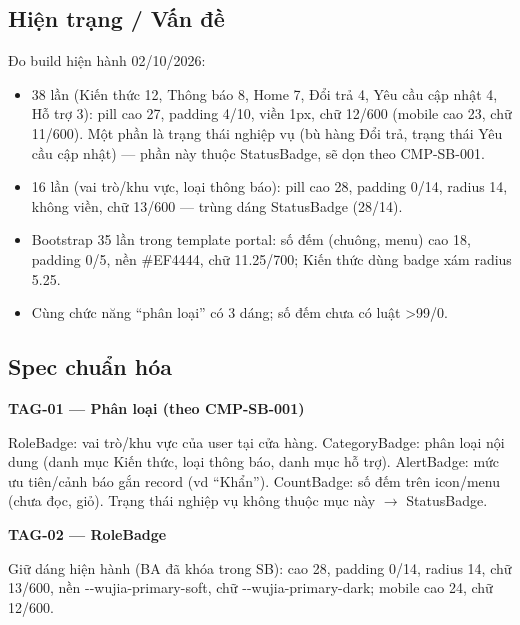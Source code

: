 \documentclass[11pt,a4paper]{report}
\begin{document}
\subsection*{Hiện trạng / Vấn đề}
Đo build hiện hành 02/\allowbreak{}10/\allowbreak{}2026:\par
\begin{itemize}
\item {} 38 lần (Kiến thức 12, Thông báo 8, Home 7, Đổi trả 4, Yêu cầu cập nhật 4, Hỗ trợ 3): pill cao 27, padding 4/\allowbreak{}10, viền 1px, chữ 12/\allowbreak{}600 (mobile cao 23, chữ 11/\allowbreak{}600). Một phần là trạng thái nghiệp vụ (bù hàng Đổi trả, trạng thái Yêu cầu cập nhật) — phần này thuộc StatusBadge, sẽ dọn theo CMP-SB-001.
\item {} 16 lần (vai trò/\allowbreak{}khu vực, loại thông báo): pill cao 28, padding 0/\allowbreak{}14, radius 14, không viền, chữ 13/\allowbreak{}600 — trùng dáng StatusBadge (28/\allowbreak{}14).
\item Bootstrap  35 lần trong template portal: số đếm (chuông, menu) cao 18, padding 0/\allowbreak{}5, nền \#EF4444, chữ 11.25/\allowbreak{}700; Kiến thức dùng badge xám radius 5.25.
\item Cùng chức năng “phân loại” có 3 dáng; số đếm chưa có luật \textgreater{}99/\allowbreak{}0.
\end{itemize}
\subsection*{Spec chuẩn hóa}
\par\smallskip\textbf{TAG-01 — Phân loại (theo CMP-SB-001)}\par
RoleBadge: vai trò/\allowbreak{}khu vực của user tại cửa hàng. CategoryBadge: phân loại nội dung (danh mục Kiến thức, loại thông báo, danh mục hỗ trợ). AlertBadge: mức ưu tiên/\allowbreak{}cảnh báo gắn record (vd “Khẩn”). CountBadge: số đếm trên icon/\allowbreak{}menu (chưa đọc, giỏ). Trạng thái nghiệp vụ không thuộc mục này \(\to\) StatusBadge.\par

\par\smallskip\textbf{TAG-02 — RoleBadge}\par
Giữ dáng  hiện hành (BA đã khóa trong SB): cao 28, padding 0/\allowbreak{}14, radius 14, chữ 13/\allowbreak{}600, nền -\kern0pt-\allowbreak{}wujia-\allowbreak{}primary-\allowbreak{}soft, chữ -\kern0pt-\allowbreak{}wujia-\allowbreak{}primary-\allowbreak{}dark; mobile cao 24, chữ 12/\allowbreak{}600.\par
\end{document}
